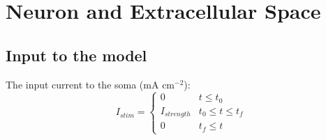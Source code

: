 \documentclass[11pt]{elsarticle}
\begin{document}
\section{Neuron and Extracellular Space}

\subsection{Input to the model}
The input current to the soma (mA cm$^{-2}$):
	\begin{equation}
	I_{stim} = 
	\begin{cases} 
	      0 & t\leq t_0 \\
	      I_{strength} & t_0\leq t\leq t_f \\
	      0 & t_f\leq t 
	\end{cases}
	\end{equation}
%
\end{document}
